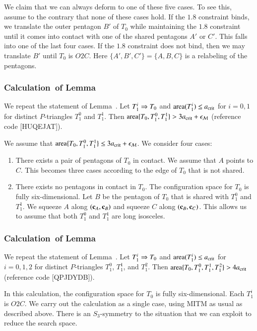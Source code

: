 We claim that we can always deform to one of these five cases.  To see
this, assume to the contrary that none of these cases hold.  If the
$1.8$ constraint binds, we translate the outer pentagon $B'$ of $T_0$
while maintaining the $1.8$ constraint until it comes into contact
with one of the shared pentagons $A'$ or $C'$. This falls into one of
the last four cases.  If the $1.8$ constraint does not bind, then we
may translate $B'$ until $T_0$ is $O2C$.  Here
$\{A',B',C'\}=\{A,B,C\}$ is a relabeling of the pentagons.

\subsubsection{Calculation~of Lemma~} %

We repeat the statement of Lemma~.  Let $T_1^i\Rightarrow T_0$
and ${\operatorname{area}}(T_1^i)\le a_\text{crit}$ for $i=0,1$ for distinct $P$-triangles
$T_1^0$ and $T_1^1$.  Then ${\operatorname{area}}\{T_0,T_1^0,T_1^1\} > 3a_\text{crit} +
\epsilon_{\mathcal M}$ (reference code [HUQEJAT]).

We assume that ${\operatorname{area}}\{T_0,T_1^0,T_1^1\}\le 3a_\text{crit} + \epsilon_{\mathcal M}$.  We
consider four cases:
\begin{enumerate}  
\item There exists a pair of pentagons of $T_0$ in contact.  We assume
  that $A$ points to $C$.  This becomes three cases according to
  the edge of $T_0$ that is not shared.
\item There exists no pentagons in contact in $T_0$.  The
  configuration space for $T_0$ is fully six-dimensional.  Let $B$ be
  the pentagon of $T_0$ that is shared with $T_1^0$ and $T_1^1$.  We
  squeeze $A$ along $({\mathbf c}_A,{\mathbf c}_B)$ and squeeze $C$ along $({\mathbf c}_B,{\mathbf c}_C)$.
  This allows us to assume that both $T_1^0$ and $T_1^1$ are long
  isosceles.
\end{enumerate}  

\subsubsection{Calculation~of Lemma~} 

We repeat the statement of Lemma~.  Let $T_1^i\Rightarrow T_0$
and ${\operatorname{area}}(T_1^i)\le a_\text{crit}$ for $i=0,1,2$ for distinct $P$-triangles
$T_1^0$, $T_1^1$, and $T_1^2$.  Then ${\operatorname{area}}\{T_0,T_1^0,T_1^1,T_1^2\} >
4a_\text{crit}$ (reference code [QPJDYDB]).

In this calculation, the configuration space for $T_0$ is fully
six-dimensional.  Each $T_1^i$ is $O2C$.  We carry out the calculation
as a single case, using MITM as usual as described above.  There is an
$S_3$-symmetry to the situation that we can exploit to reduce the
search space.
